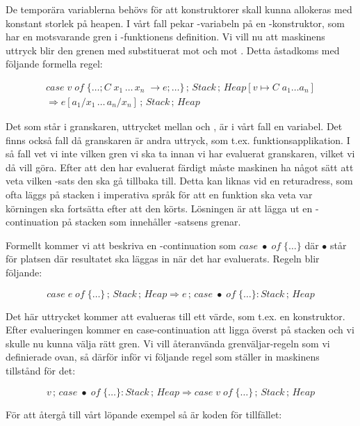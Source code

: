 \documentclass[../Core]{subfiles}
\begin{document}
De temporära variablerna behövs för att konstruktorer skall kunna
allokeras med konstant storlek på heapen. I vårt fall pekar
-variabeln på en -konstruktor, som har en motsvarande gren
i -funktionens definition. Vi vill nu att maskinens uttryck
blir den grenen med  substituerat mot  och  mot .
Detta åstadkoms med följande formella regel:

\begin{multline*}
case\; v\; of\;\{\ldots;C\; x_{1}\,\ldots\, x_{n}\;\rightarrow e;\ldots\}\,;\, Stack\,;\, Heap[v\mapsto C\; a_{1}\ldots a_{n}]\\
\Rightarrow e[a_{1}/x_{1}\,\ldots\, a_{n}/x_{n}]\,;\, Stack\,;\, Heap\end{multline*}


Det som står i granskaren, uttrycket mellan  och , är i vårt
fall en variabel. Det finns också fall då granskaren är andra uttryck, som
t.ex. funktionsapplikation. I så fall vet vi inte vilken gren vi ska
ta innan vi har evaluerat granskaren, vilket vi då vill göra.
Efter att den har evaluerat färdigt måste maskinen ha något sätt att
veta vilken -sats den ska gå tillbaka till. Detta kan liknas
vid en returadress, som ofta läggs på stacken i imperativa språk för att
en funktion ska veta var körningen ska fortsätta efter att den körts.
Lösningen är att lägga ut en -continuation på stacken
som innehåller -satsens grenar.

Formellt kommer vi att beskriva en -continuation som $case\;\bullet\; of\;\{\ldots\}$
där $\bullet$ står för platsen där resultatet ska läggas in när det har evaluerats. Regeln
blir följande:

\[
case\; e\; of\;\{\ldots\}\,;\, Stack\,;\, Heap\Rightarrow e\,;\, case\;\bullet\; of\;\{\ldots\}:Stack\,;\, Heap\]


Det här uttrycket kommer att evalueras till ett värde, som t.ex. en konstruktor.
Efter evalueringen kommer en case-continuation att ligga överst på stacken och vi skulle nu kunna välja
rätt gren. Vi vill återanvända grenväljar-regeln som vi definierade
ovan, så därför inför vi följande regel som ställer in maskinens tillstånd för det:

\[
v\,;\, case\;\bullet\; of\;\{\ldots\}:Stack\,;\, Heap\Rightarrow case\; v\; of\;\{\ldots\}\,;\, Stack\,;\, Heap\]


För att återgå till vårt löpande exempel så är koden för tillfället:
\end{document}
